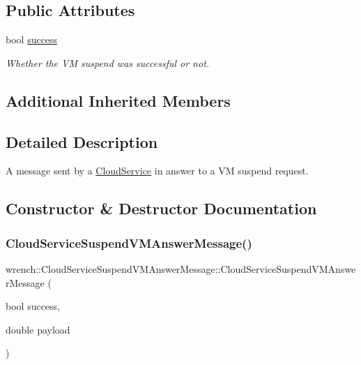\subsection*{Public Attributes}
\begin{DoxyCompactItemize}
\item 
\mbox{\label{classwrench_1_1_cloud_service_suspend_v_m_answer_message_a68371e3f2be2d713de425e0c2d8c5a93}} 
bool \hyperlink{classwrench_1_1_cloud_service_suspend_v_m_answer_message_a68371e3f2be2d713de425e0c2d8c5a93}{success}
\begin{DoxyCompactList}\small\item\em Whether the VM suspend was successful or not. \end{DoxyCompactList}\end{DoxyCompactItemize}
\subsection*{Additional Inherited Members}


\subsection{Detailed Description}
A message sent by a \hyperlink{classwrench_1_1_cloud_service}{Cloud\+Service} in answer to a VM suspend request. 

\subsection{Constructor \& Destructor Documentation}
\mbox{\label{classwrench_1_1_cloud_service_suspend_v_m_answer_message_ae0de72d0470fad3a7a51432a3b3ad141}} 
\subsubsection{\texorpdfstring{Cloud\+Service\+Suspend\+V\+M\+Answer\+Message()}{CloudServiceSuspendVMAnswerMessage()}}
{\footnotesize\ttfamily wrench\+::\+Cloud\+Service\+Suspend\+V\+M\+Answer\+Message\+::\+Cloud\+Service\+Suspend\+V\+M\+Answer\+Message (\begin{DoxyParamCaption}\item[{bool}]{success,  }\item[{double}]{payload }\end{DoxyParamCaption})}



